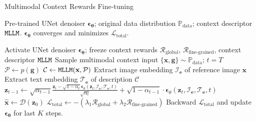 \begin{algorithm}[!t]
\small
\caption{Multimodal Context Rewards Fine-tuning}
\label{algorithm:prompt-fine-tune}
\begin{algorithmic}
\Require  Pre-trained UNet denoiser
$\bm{\epsilon}_{\bm\theta}$; original data distribution $\mathbb{P}_\mathrm{data}$; context descriptor $\tt{MLLM}$.
\Ensure $\bm{\epsilon}_{\bm\theta}$ converges and minimizes $\mathcal{L}_\textrm{total}$. 

\State Activate UNet denoiser $\bm{\epsilon}_{\bm\theta}$; freeze context rewards $\mathcal{R}_\textrm{global}$, $\mathcal{R}_\textrm{fine-grained}$, context descriptor $\tt{MLLM}$
\State Sample multimodal context input $\{\mathbf{x}, \mathbf{g}\} \sim \mathbb{P}_\mathrm{data}$; $t=T$
\State $\mathcal{P} \leftarrow p(\mathbf{g})$ 
\State $\mathcal{C} \leftarrow \tt{MLLM} (\mathbf{x}, \mathcal{P})$ 
\State Extract image embedding $\mathcal{I}_\mathbf{e}$ of reference image $\mathbf{x}$
\State Extract text embedding $\mathcal{T}_\mathbf{e}$ of description $\mathcal{C}$
 
\State $\mathbf{z}_{t-1} \leftarrow \sqrt{\alpha_{t-1}}\frac{\mathbf{z}_t-\sqrt{1-\alpha_t} \boldsymbol{\epsilon}_\theta\left(\mathbf{z}_t, \mathcal{I}_\mathbf{e}, \mathcal{T}_\mathbf{e}, t\right)}{\sqrt{\alpha_t}}+\sqrt{1-\alpha_{t-1}} \cdot \boldsymbol{\epsilon}_\theta\left(\mathbf{z}_t, \mathcal{I}_\mathbf{e}, \mathcal{T}_\mathbf{e}, t\right)$
\EndWhile
\State $\hat{\mathbf{x}} \leftarrow \mathcal{D}(\mathbf{z}_0)$ 
\State $    \mathcal{L}_{\textrm{total}} \leftarrow  -(\lambda_1 \mathcal{R}_\textrm{global} +\lambda_2 \mathcal{R}_\textrm{fine-grained})$
\State Backward $\mathcal{L}_{\textrm{total}}$ and update $\bm{\epsilon}_{\bm\theta}$ for last $K$ steps. 
\EndWhile
\end{algorithmic} 
\end{algorithm}





